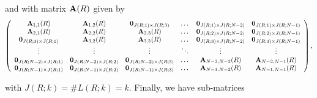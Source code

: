 \documentclass[preprint,12pt]{elsarticle}
\begin{document}
\par\noindent and with matrix ${\bf A}(R)$ given by
\begin{equation*}
  \left(\begin{array}{cccccc}
{\bf A}_{1,1}(R) & {\bf A}_{1,2}(R) & {\bf 0}_{J(R;1)\times J(R;3)} & \dots & {\bf 0}_{J(R;1)\times J(R;N-2)} & {\bf 0}_{J(R;1)\times J(R;N-1)}\\
{\bf A}_{2,1}(R) & {\bf A}_{2,2}(R) & {\bf A}_{2,3}(R) & \dots & {\bf 0}_{J(R;2)\times J(R;N-2)} & {\bf 0}_{J(R;2)\times J(R;N-1)}\\
{\bf 0}_{J(R;3)\times J(R;1)} & {\bf A}_{3,2}(R) & {\bf A}_{3,3}(R) & \dots & {\bf 0}_{J(R;3)\times J(R;N-2)} & {\bf 0}_{J(R;3)\times J(R;N-1)}\\
\vdots & \vdots & \vdots & \ddots & \vdots & \vdots\\
{\bf 0}_{J(R;N-2)\times J(R;1)} & {\bf 0}_{J(R;N-2)\times J(R;2)} & {\bf 0}_{J(R;N-2)\times J(R;3)} & \dots & {\bf A}_{N-2,N-2}(R) & {\bf A}_{N-2,N-1}(R) \\
{\bf 0}_{J(R;N-1)\times J(R;1)} & {\bf 0}_{J(R;N-1)\times J(R;2)} & {\bf 0}_{J(R;N-1)\times J(R;3)} & \dots & {\bf A}_{N-1,N-2}(R) & {\bf A}_{N-1,N-1}(R)
                        \end{array}\right),
\end{equation*}
\par\noindent with $J(R;k)=\#L(R;k)=k$. Finally, we have sub-matrices
\end{document}
